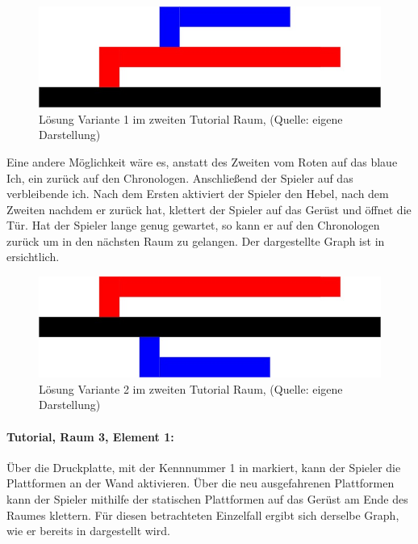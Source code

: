 \begin{figure}[ht]
\centering
\includegraphics[width=0.8\linewidth]{content/pictures/Raetsel-L01_R02_V01_Loesung.jpg}
\caption{Lösung Variante 1 im zweiten Tutorial Raum, (Quelle: eigene Darstellung)}
\label{fig:L01_R02_V01_L}
\end{figure}

Eine andere Möglichkeit wäre es, anstatt des Zweiten  vom Roten auf das blaue Ich, ein  zurück auf den Chronologen. Anschließend  der Spieler auf das verbleibende ich. Nach dem Ersten  aktiviert der Spieler den Hebel, nach dem Zweiten  nachdem er zurück  hat, klettert der Spieler auf das Gerüst und öffnet die Tür. Hat der Spieler lange genug gewartet, so kann er auf den Chronologen zurück  um in den nächsten Raum zu gelangen. Der dargestellte Graph ist in  ersichtlich.

\begin{figure}[ht]
\centering
\includegraphics[width=0.8\linewidth]{content/pictures/Raetsel-L01_R02_V02_Loesung.jpg}
\caption{Lösung Variante 2 im zweiten Tutorial Raum, (Quelle: eigene Darstellung)}
\label{fig:L01_R02_V02_L}
\end{figure}

\paragraph{Tutorial, Raum 3, Element 1:}

Über die Druckplatte, mit der Kennnummer 1 in  markiert, kann der Spieler die Plattformen an der Wand aktivieren. Über die neu ausgefahrenen Plattformen kann der Spieler mithilfe der statischen Plattformen auf das Gerüst am Ende des Raumes klettern. Für diesen betrachteten Einzelfall ergibt sich derselbe Graph, wie er bereits in  dargestellt wird.

